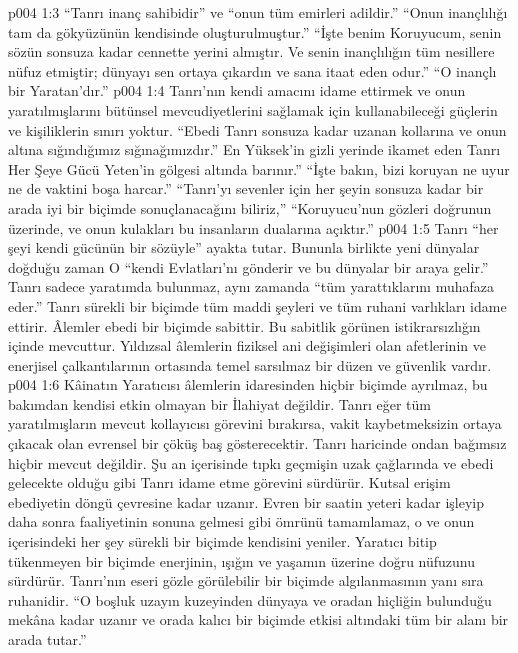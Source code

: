 \vs p004 1:3 “Tanrı inanç sahibidir” ve “onun tüm emirleri adildir.” “Onun inançlılığı tam da gökyüzünün kendisinde oluşturulmuştur.” “İşte benim Koruyucum, senin sözün sonsuza kadar cennette yerini almıştır. Ve senin inançlılığın tüm nesillere nüfuz etmiştir; dünyayı sen ortaya çıkardın ve sana itaat eden odur.” “O inançlı bir Yaratan’dır.”
\vs p004 1:4 Tanrı’nın kendi amacını idame ettirmek ve onun yaratılmışlarını bütünsel mevcudiyetlerini sağlamak için kullanabileceği güçlerin ve kişiliklerin sınırı yoktur. “Ebedi Tanrı sonsuza kadar uzanan kollarına ve onun altına sığındığımız sığınağımızdır.” En Yüksek’in gizli yerinde ikamet eden Tanrı Her Şeye Gücü Yeten’in gölgesi altında barınır.” “İşte bakın, bizi koruyan ne uyur ne de vaktini boşa harcar.” “Tanrı’yı sevenler için her şeyin sonsuza kadar bir arada iyi bir biçimde sonuçlanacağını biliriz,” “Koruyucu’nun gözleri doğrunun üzerinde, ve onun kulakları bu insanların dualarına açıktır.”
\vs p004 1:5 Tanrı “her şeyi kendi gücünün bir sözüyle” ayakta tutar. Bununla birlikte yeni dünyalar doğduğu zaman O “kendi Evlatları’nı gönderir ve bu dünyalar bir araya gelir.” Tanrı sadece yaratımda bulunmaz, aynı zamanda “tüm yarattıklarını muhafaza eder.” Tanrı sürekli bir biçimde tüm maddi şeyleri ve tüm ruhani varlıkları idame ettirir. Âlemler ebedi bir biçimde sabittir. Bu sabitlik görünen istikrarsızlığın içinde mevcuttur. Yıldızsal âlemlerin fiziksel ani değişimleri olan afetlerinin ve enerjisel çalkantılarının ortasında temel sarsılmaz bir düzen ve güvenlik vardır.
\vs p004 1:6 Kâinatın Yaratıcısı âlemlerin idaresinden hiçbir biçimde ayrılmaz, bu bakımdan kendisi etkin olmayan bir İlahiyat değildir. Tanrı eğer tüm yaratılmışların mevcut kollayıcısı görevini bırakırsa, vakit kaybetmeksizin ortaya çıkacak olan evrensel bir çöküş baş gösterecektir. Tanrı haricinde ondan bağımsız hiçbir  mevcut değildir. Şu an içerisinde tıpkı geçmişin uzak çağlarında ve ebedi gelecekte olduğu gibi Tanrı idame etme görevini sürdürür. Kutsal erişim ebediyetin döngü çevresine kadar uzanır. Evren bir saatin yeteri kadar işleyip daha sonra faaliyetinin sonuna gelmesi gibi ömrünü tamamlamaz, o ve onun içerisindeki her şey sürekli bir biçimde kendisini yeniler. Yaratıcı bitip tükenmeyen bir biçimde enerjinin, ışığın ve yaşamın üzerine doğru nüfuzunu sürdürür. Tanrı’nın eseri gözle görülebilir bir biçimde algılanmasının yanı sıra ruhanidir. “O boşluk uzayın kuzeyinden dünyaya ve oradan hiçliğin bulunduğu mekâna kadar uzanır ve orada kalıcı bir biçimde etkisi altındaki tüm bir alanı bir arada tutar.”
